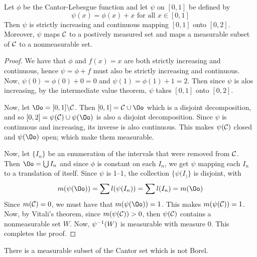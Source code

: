 \begin{theorem}\label{8.6.3}
    Let $\phi$ be the Cantor-Lebesgue function and let $\psi$ on $[0,1]$ be
    defined by
    \begin{equation*}
        \psi(x)=\phi(x)+x \text{ for all } x \in [0,1]
    \end{equation*}
    Then $\psi$ is strictly increasing and continuous mapping  $[0,1]$ onto
    $[0,2]$. Moreover, $\psi$ maps  $\mathcal{C}$ to a postively measured set and maps a
    measurable subset of  $\mathcal{C}$ to a nonmeasurable set.
\end{theorem}
\begin{proof}
    We have that $\phi$ and $f(x)=x$ are both strictly increasing and
    continuous, hence $\psi=\phi+f$ must also be strictly increasing and
    continuous. Now,  $\psi(0)=\phi(0)+0=0$ and $\psi(1)=\phi(1)+1=2$. Then
    since $\psi$ is alos increasing, by the intermediate value theorem,  $\psi$
    takes  $[0,1]$ onto $[0,2]$.

    Now, let $\Oo=\com{[0,1]}{\Cc}$. Then $[0,1]=\Cc \cup \Oo$ which is a
    disjoint decomposition, and so $[0,2]=\psi(\Cc) \cup \psi(\Oo)$ is also a
    disjoint decomposition. Since $\psi$ is continuous and increasing, its
    inverse is also continuous. This makes  $\psi(\mathcal{C})$ closed and $\psi(\Oo)$
    open; which make them measurable.

    Now, let $\{I_n\}$ be an enumeration of the intervals that were removed from
    $\mathcal{C}$. Then  $\Oo=\bigcup{I_n}$ and since $\phi$ is constant on each  $I_n$,
    we get  $\psi$ mapping each  $I_n$ to a translation of itself. Since $\psi$
    is 1--1, the collection  $\{\psi(I_)\}$ is disjoint, with
    \begin{equation*}
        m(\psi(\Oo))=\sum{l(\psi(I_n))}=\sum{l(I_n)}=m(\Oo)
    \end{equation*}
    Since $m(\mathcal{C})=0$, we must have that $m(\psi(\Oo))=1$. This makes
    $m(\psi(\mathcal{C}))=1$. Now, by Vitali's theorem, since $m(\psi(\mathcal{C}))>0$, then
    $\psi(\mathcal{C})$ contains a nonmeasurable set $W$. Now,  $\psi^{-1}(W)$ is
    measurable with measure $0$. This completes the proof.
\end{proof}
\begin{corollary}
    There is a measurable subset of the Cantor set which is not Borel.
\end{corollary}
